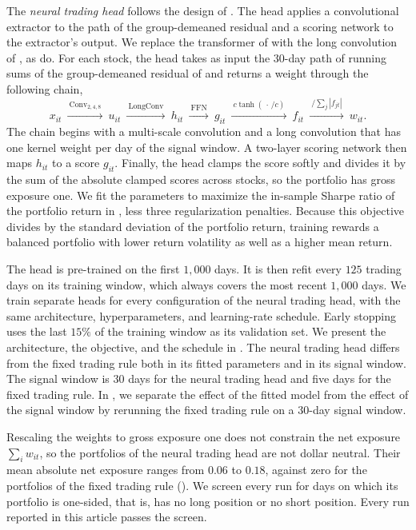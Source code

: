 The \emph{neural trading head} follows the design of \citet{guijarro2025deep}. The head applies a convolutional
extractor to the path of the group-demeaned residual and a scoring network to the extractor's output.
We replace the transformer of \citet{guijarro2025deep} with the long convolution of
\citet{fu2023simple}, as \citet{epstein2025attention} do. For each stock, the head takes as input the 30-day path of running sums of the group-demeaned residual of  and returns a weight through the following chain,
%
\[
  x_{it}\ \xrightarrow{\ \mathrm{Conv}_{2,4,8}\ }\ u_{it}\ \xrightarrow{\ \mathrm{LongConv}\ }\ h_{it}
  \ \xrightarrow{\ \mathrm{FFN}\ }\ g_{it}
  \ \xrightarrow{\ c\tanh(\,\cdot\,/c)\ }\ f_{it}
  \ \xrightarrow{\ /\sum_j |f_{jt}|\ }\ w_{it}.
\]
%
The chain begins with a multi-scale convolution and a long convolution that has one kernel weight per day of the signal window. A two-layer scoring network then maps $h_{it}$ to a score $g_{it}$. Finally, the head clamps the score softly and divides it by the sum of the absolute clamped scores across stocks, so the portfolio has gross exposure one. We fit the parameters to maximize the in-sample
Sharpe ratio of the portfolio return in , less three
regularization penalties. Because this objective divides by the standard deviation of the portfolio return, training rewards a balanced portfolio with lower return volatility as well as a higher mean return.

The head is pre-trained on the first $1{,}000$ days. It is then refit every $125$ trading days on its training window, which always covers the most recent $1{,}000$ days. We train separate heads for every configuration of the neural trading head, with the same architecture, hyperparameters, and learning-rate schedule. Early stopping uses the last $15\%$ of the training window as its validation set.
We present the architecture, the objective, and the schedule in . The neural trading head differs from the fixed trading rule both in its fitted parameters and in its signal window. The signal window is $30$ days for the neural trading head and five days for the fixed trading rule. In , we separate the effect of the fitted model from the effect of the signal window by rerunning the fixed trading rule on a $30$-day signal window.

Rescaling the weights to gross exposure one does not constrain the net exposure $\sum_i w_{it}$, so the portfolios of the neural trading head are not dollar neutral. Their mean absolute net exposure ranges from $0.06$ to $0.18$, against zero for the portfolios of the fixed trading rule ().
We screen every run for days on which its portfolio is one-sided, that is, has no long position or no short position. Every run reported in this article passes the screen.

